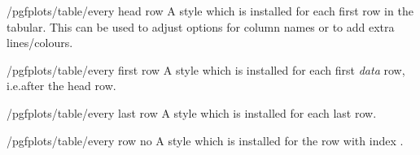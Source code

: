 \documentclass[a4paper]{ltxdoc}
\begin{document}
\begin{stylekey}{/pgfplots/table/every head row}
    A style which is installed for each first row in the tabular. This can be
    used to adjust options for column names or to add extra lines/colours.

\begin{codeexample}[]
\end{codeexample}
\end{stylekey}

\begin{stylekey}{/pgfplots/table/every first row}
    A style which is installed for each first \emph{data} row, i.e.\@ after the
    head row.
\end{stylekey}

\begin{stylekey}{/pgfplots/table/every last row}
    A style which is installed for each last row.
\end{stylekey}

\begin{stylekey}{/pgfplots/table/every row no }
    A style which is installed for the row with index .
\end{stylekey}
\end{document}
